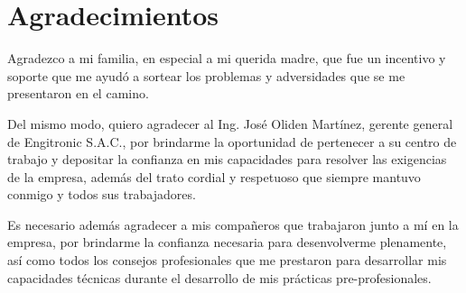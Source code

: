 \cleardoublepage
{}
{}
\chapter*{Agradecimientos}
\vspace{1.0in}

Agradezco a mi familia, en especial a mi querida madre, que fue un incentivo y soporte que me ayudó a sortear los problemas y adversidades que se me presentaron en el camino.

Del mismo modo, quiero agradecer al Ing. José Oliden Martínez, gerente general de Engitronic S.A.C., por brindarme la oportunidad de pertenecer a su centro de trabajo y depositar la confianza en mis capacidades para resolver las exigencias de la empresa, además del trato cordial y respetuoso que siempre mantuvo conmigo y todos sus trabajadores.

Es necesario además agradecer a mis compañeros que trabajaron junto a mí en la empresa, por brindarme la confianza necesaria para desenvolverme plenamente, así como todos los consejos profesionales que me prestaron para desarrollar mis capacidades técnicas durante el desarrollo de mis prácticas pre-profesionales.


\newpage
